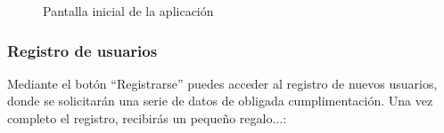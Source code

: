 \begin{figure} [!htb]
	\centering
	\caption{Pantalla inicial de la aplicación}
	\label{fig:pantallaInicial}
\end{figure}

\FloatBarrier
\subsubsection{Registro de usuarios}

Mediante el botón ``Registrarse'' puedes acceder al registro de nuevos usuarios, donde se solicitarán una serie de datos de obligada cumplimentación. Una vez completo el registro, recibirás un pequeño regalo...\smiley:

